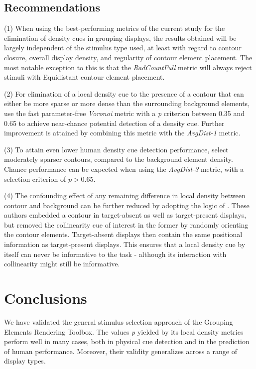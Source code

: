 \documentclass[12pt]{article}
\begin{document}
\subsection{Recommendations}\label{subsection_discussion_recommendations}

(1) When using the best-performing metrics of the current study for the elimination of density cues in grouping displays, the results obtained will be largely independent of the stimulus type used, at least with regard to contour closure, overall display density, and regularity of contour element placement. The most notable exception to this is that the \emph{RadCountFull} metric will always reject stimuli with Equidistant contour element placement.

(2) For elimination of a local density cue to the presence of a contour that can either be more sparse or more dense than the surrounding background elements, use the fast parameter-free \emph{Voronoi} metric with a \emph{p} criterion between 0.35 and 0.65 to achieve near-chance potential detection of a density cue. Further improvement is attained by combining this metric with the \emph{AvgDist-1} metric.

(3) To attain even lower human density cue detection performance, select moderately sparser contours, compared to the background element density. Chance performance can be expected when using the \emph{AvgDist-3} metric, with a selection criterion of $p > 0.65$.

(4) The confounding effect of any remaining difference in local density between contour and background can be further reduced by adopting the logic of . These authors embedded a contour in target-absent as well as target-present displays, but removed the collinearity cue of interest in the former by randomly orienting the contour elements. Target-absent displays then contain the same positional information as target-present displays. This ensures that a local density cue by itself can never be informative to the task - although its interaction with collinearity might still be informative.


\section{Conclusions}
We have validated the general stimulus selection approach of the Grouping Elements Rendering Toolbox. The values \emph{p} yielded by its local density metrics perform well in many cases, both in physical cue detection and in the prediction of human performance. Moreover, their validity generalizes across a range of display types.
\end{document}
